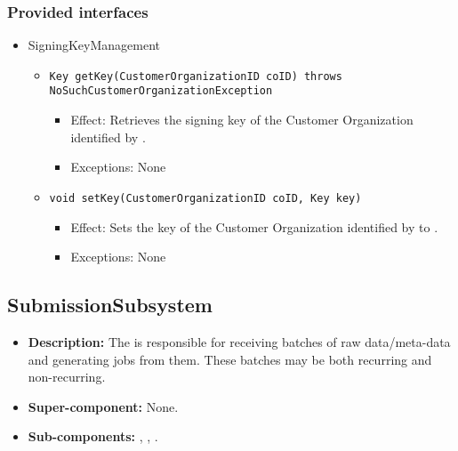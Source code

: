 \subsubsection*{Provided interfaces}
\begin{itemize}
    \item SigningKeyManagement
    \begin{itemize}
        \item \texttt{Key getKey(CustomerOrganizationID coID) throws NoSuchCustomerOrganizationException}
		    \begin{itemize}
                \item Effect: Retrieves the signing key of the Customer Organization identified by .
                \item Exceptions: None
            \end{itemize}

		\item \texttt{void setKey(CustomerOrganizationID coID, Key key)}
		    \begin{itemize}
                \item Effect: Sets the key of the Customer Organization identified by  to .
                \item Exceptions: None
            \end{itemize}
    \end{itemize}
\end{itemize}

\subsection{SubmissionSubsystem}
\begin{itemize}
    \item \textbf{Description:} The  is responsible for receiving batches of raw data/meta-data and generating jobs from them. These batches may be both recurring and non-recurring. 
    \item \textbf{Super-component:} None.
    \item \textbf{Sub-components:} , , .
\end{itemize}

